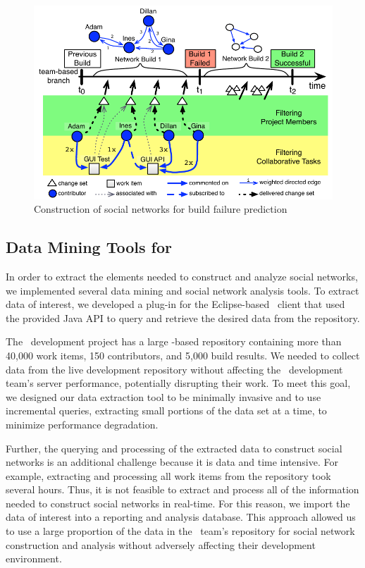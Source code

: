\begin{figure}[tb]
\begin{center}
\includegraphics[width=1.3\columnwidth]{./figures/BuildResultNetworks}
\caption{Construction of social networks for build failure prediction}
\label{fig:BuildSNs}
\end{center}
\end{figure}

\subsection{Data Mining Tools for \jazztm}
In order to extract the elements needed to construct and analyze social networks,
we implemented several data mining and social network analysis tools. To extract
data of interest, we developed a plug-in for the Eclipse-based \jazztm\ client
that used the provided Java API to query and retrieve the desired data from the
repository.

The \jazztm\ development project has a large \jazztm-based repository containing
more than 40,000 work items, 150 contributors, and 5,000 build results. We
needed to collect data from the live development repository without affecting the
\jazztm\ development team's server performance, potentially disrupting their
work. To meet this goal, we designed our data extraction tool to be minimally
invasive and to use incremental queries, extracting small portions of the data
set at a time, to minimize performance degradation.

Further, the querying and processing of the extracted data to construct social
networks is an additional challenge because it is data and time intensive. For
example, extracting and processing all work items from the repository took
several hours. Thus, it is not feasible to extract and process all of the
information needed to construct social networks in real-time. For this reason, we
import the data of interest into a reporting and analysis database. This approach
allowed us to use a large proportion of the data in the \jazztm\ team's
repository for social network construction and analysis without adversely
affecting their development environment.

